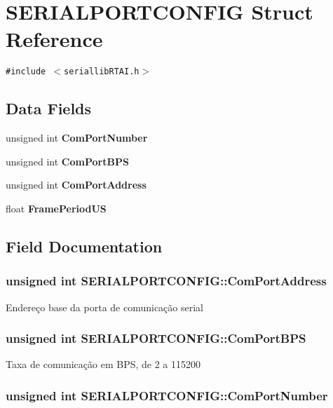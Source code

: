 \section{SERIALPORTCONFIG Struct Reference}
\label{structSERIALPORTCONFIG}
{\tt \#include $<$seriallib\-RTAI.h$>$}

\subsection*{Data Fields}
\begin{CompactItemize}
\item 
unsigned int \bf{Com\-Port\-Number}
\item 
unsigned int \bf{Com\-Port\-BPS}
\item 
unsigned int \bf{Com\-Port\-Address}
\item 
float \bf{Frame\-Period\-US}
\end{CompactItemize}


\subsection{Field Documentation}
\subsubsection{\setlength{\rightskip}{0pt plus 5cm}unsigned int \bf{SERIALPORTCONFIG::Com\-Port\-Address}}\label{structSERIALPORTCONFIG_60c95986733fae1a71ab89bd97ebfed4}


Endere\c{c}o base da porta de comunica\c{c}\~{a}o serial 
\subsubsection{\setlength{\rightskip}{0pt plus 5cm}unsigned int \bf{SERIALPORTCONFIG::Com\-Port\-BPS}}\label{structSERIALPORTCONFIG_a6dea3f4c4292d4be56bbf2d7ac4c196}


Taxa de comunica\c{c}\~{a}o em BPS, de 2 a 115200 
\subsubsection{\setlength{\rightskip}{0pt plus 5cm}unsigned int \bf{SERIALPORTCONFIG::Com\-Port\-Number}}\label{structSERIALPORTCONFIG_fdab9b8ca1ed50f3970ac4d7215366e1}


